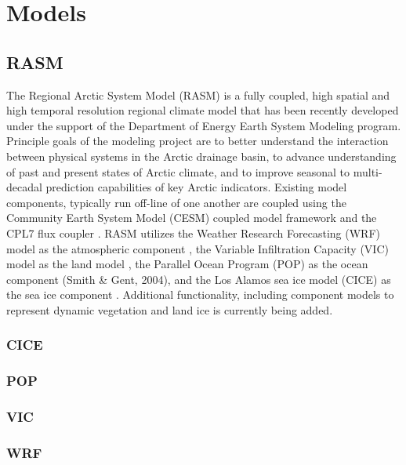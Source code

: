 \section{Models}

\subsection{RASM}

The Regional Arctic System Model (RASM) is a fully coupled, high spatial and high temporal resolution regional climate model that has been recently developed under the support of the Department of Energy Earth System Modeling program.
Principle goals of the modeling project are to better understand the interaction between physical systems in the Arctic drainage basin, to advance understanding of past and present states of Arctic climate, and to improve seasonal to multi-decadal prediction capabilities of key Arctic indicators.
Existing model components, typically run off-line of one another are coupled using the Community Earth System Model (CESM) coupled model framework and the CPL7 flux coupler \cite{Craig_2011}.
RASM utilizes the Weather Research Forecasting (WRF) model as the atmospheric component \cite{Skamarock_2008}, the Variable Infiltration Capacity (VIC) model as the land model \citep[e.g.][Hamman et al. In Review]{Liang_1996}, the Parallel Ocean Program (POP) as the ocean component (Smith \& Gent, 2004), and the Los Alamos sea ice model (CICE) as the sea ice component \cite{hunke:2010}.
Additional functionality, including component models to represent dynamic vegetation and land ice is currently being added.

\subsubsection{CICE}

\subsubsection{POP}

\subsubsection{VIC}

\subsubsection{WRF}

